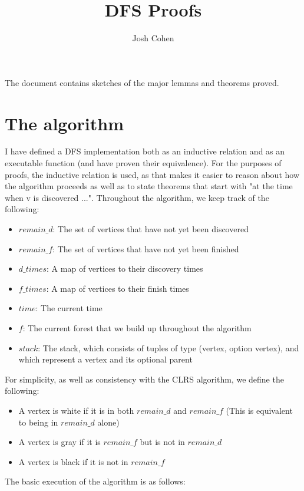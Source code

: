 \documentclass{article}
\title{DFS Proofs}
\author{Josh Cohen}
\begin{document}
\maketitle
The document contains sketches of the major lemmas and theorems proved.
\section{The algorithm}
I have defined a DFS implementation both as an inductive relation and as an executable function (and have proven their equivalence). For the purposes of proofs, the inductive relation is used, as that makes it easier to reason about how the algorithm proceeds as well as to state theorems that start with "at the time when v is discovered ...". Throughout the algorithm, we keep track of the following:
\begin{itemize}
\item
$remain\_d$: The set of vertices that have not yet been discovered
\item
$remain\_f$: The set of vertices that have not yet been finished
\item
$d\_times$: A map of vertices to their discovery times
\item
$f\_times$: A map of vertices to their finish times
\item
$time$: The current time
\item
$f$: The current forest that we build up throughout the algorithm
\item
$stack$: The stack, which consists of tuples of type (vertex, option vertex), and which represent a vertex and its optional parent
\end{itemize}
For simplicity, as well as consistency with the CLRS algorithm, we define the following:
\begin{itemize}
\item
A vertex is white if it is in both $remain\_d$ and $remain\_f$ (This is equivalent to being in $remain\_d$ alone)
\item
A vertex is gray if it is $remain\_f$ but is not in $remain\_d$
\item
A vertex is black if it is not in $remain\_f$
\end{itemize}
The basic execution of the algorithm is as follows:
\pagebreak
\begin{algorithmic}
\EndWhile
{}
\EndIf
{}
\EndIf
{}
\EndWhile
\end{algorithmic}
\end{document}
